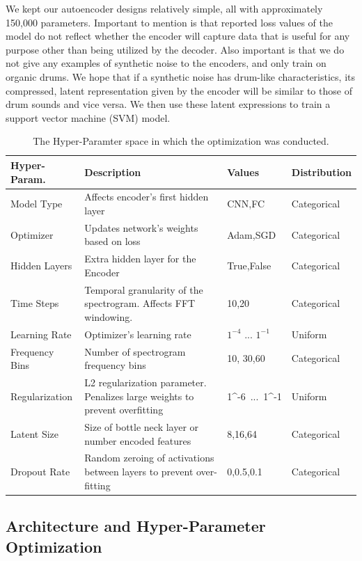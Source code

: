 \documentclass[\main/thesis.tex]{subfiles}
\begin{document}
We kept our autoencoder designs relatively simple, all with approximately 150,000 parameters. Important to mention is that reported loss values of the model do not reflect whether the encoder will capture data that is useful for any purpose other than being utilized by the decoder. Also important is that we do not give any examples of synthetic noise to the encoders, and only train on organic drums. We hope that if a synthetic noise has drum-like characteristics, its compressed, latent representation given by the encoder will be similar to those of drum sounds and vice versa. We then use these latent expressions to train a support vector machine (SVM) model.
\begin{table}[h!]

\begin{tabular}{|p{28mm}|p{50mm}|p{21mm}|p{21mm}|}
\hline
Hyper-Param. & Description  & Values & Distribution\\ \hline
Model Type      &   Affects encoder's first hidden layer & CNN,FC & Categorical \\  \hline
Optimizer       & Updates network's weights based on loss & Adam,SGD & Categorical  \\  \hline
Hidden Layers   & Extra hidden layer for the Encoder & True,False & Categorical \\  \hline
Time Steps & Temporal granularity of the spectrogram. Affects FFT windowing. & 10,20 & Categorical  \\ \hline
Learning Rate   &    Optimizer's learning rate  & $1^{-4}$ ... $1^{-1}$ & Uniform      \\ \hline
Frequency Bins & Number of spectrogram frequency bins & 10, 30,60 & Categorical \\ \hline

Regularization  &  L2 regularization parameter. Penalizes large weights to prevent overfitting & 1^{-6}~...~1^{-1} & Uniform\\ \hline
Latent Size & Size of bottle neck layer or number encoded features & 8,16,64 & Categorical              \\ \hline
Dropout Rate & Random zeroing of activations between layers to prevent over-fitting & 0,0.5,0.1 & Categorical\\  \hline
\end{tabular}
\caption{The Hyper-Paramter space in which the optimization was conducted.}
\label{table:hyper_params}
\end{table}

\subsection{Architecture and Hyper-Parameter Optimization}
\end{document}
